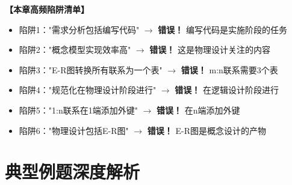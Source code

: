 \documentclass[12pt, a4paper]{article}
\newenvironment{bluebox}[1]{%
  \begin{trivlist}
  \item[\hskip\labelsep \textbf{#1}]
  \setlength{\parskip}{0.5ex}
  \setlength{\itemsep}{0.5ex}
}{%
  \end{trivlist}
  }
\begin{document}
\begin{bluebox}{高频陷阱清单}
	\textbf{【本章高频陷阱清单】}

	\begin{itemize}
		\item 陷阱1："需求分析包括编写代码" $\rightarrow$ \textbf{错误！} 编写代码是实施阶段的任务
		\item 陷阱2："概念模型实现效率高" $\rightarrow$ \textbf{错误！} 这是物理设计关注的内容
		\item 陷阱3："E-R图转换所有联系为一个表" $\rightarrow$ \textbf{错误！} m:n联系需要3个表
		\item 陷阱4："规范化在物理设计阶段进行" $\rightarrow$ \textbf{错误！} 在逻辑设计阶段进行
		\item 陷阱5："1:n联系在1端添加外键" $\rightarrow$ \textbf{错误！} 在n端添加外键
		\item 陷阱6："物理设计包括E-R图" $\rightarrow$ \textbf{错误！} E-R图是概念设计的产物
	\end{itemize}
\end{bluebox}

\section{典型例题深度解析}
\end{document}
